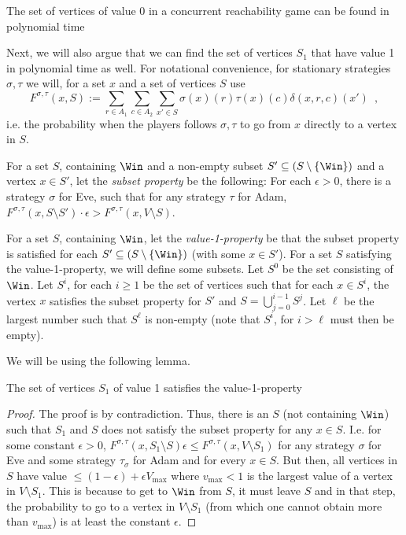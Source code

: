 \begin{lemma}\label{lemm:find_0_reach}
The set of vertices of value 0 in a concurrent reachability game can be found in polynomial time
\end{lemma}

Next, we will also argue that we can find the set of vertices $S_1$ that have value 1 in polynomial time as well.
For notational convenience, for stationary strategies $\sigma,\tau$ we will, for a set $x$ and a set of vertices $S$ use \[
F^{\sigma,\tau}(x,S):=\sum_{r\in A_1}\sum_{c\in A_2}\sum_{x'\in S}\sigma(x)(r)\tau(x)(c)\delta(x,r,c)(x')\enspace ,\]
 i.e. the probability when the players follows $\sigma,\tau$ to go from $x$ directly to a vertex in $S$.

For a set $S$, containing $\Win$ and a non-empty subset $S'\subseteq(S\setminus \{\Win\})$ and a vertex $x\in S'$, let the {\em subset property} be the following:
For each $\epsilon>0$, there is a strategy $\sigma$ for Eve, such that for any strategy $\tau$ for Adam, $F^{\sigma,\tau}(x,S\setminus S')\cdot \epsilon >F^{\sigma,\tau}(x,V\setminus S)$.

For a set $S$, containing $\Win$, let the {\em value-1-property} be that the subset property is satisfied for each $S'\subseteq(S\setminus \{\Win\})$ (with some $x\in S'$).
For a set $S$ satisfying the value-1-property, we will define some subsets.
Let $S^0$ be the set consisting of $\Win$.
Let $S^i$, for each $i\geq 1$ be the set of vertices such that for each $x\in S^i$,
the vertex $x$ satisfies the subset property for $S'$ and $S=\bigcup_{j=0}^{i-1}S^j$.
Let $\ell$ be the largest number such that $S^\ell$ is non-empty (note that $S^i$, for $i>\ell$ must then be empty).


We will be using the following lemma.



\begin{lemma}
The set of vertices $S_1$ of value 1 satisfies the value-1-property
\end{lemma}
\begin{proof}
The proof is by contradiction. Thus, there is an $S$ (not containing $\Win$) such that $S_1$ and $S$ does not satisfy the subset property for any $x\in S$. I.e. for some constant $\epsilon>0$,
$F^{\sigma,\tau}(x,S_1\setminus S)\epsilon \leq F^{\sigma,\tau}(x,V\setminus S_1)$ for any strategy $\sigma$ for Eve and some strategy $\tau_{\sigma}$ for Adam and for every $x\in S$.
But then, all vertices in $S$ have value $\leq (1-\epsilon)+\epsilon V_{\max}$ where $v_{\max}<1$ is the largest value of a vertex in $V\setminus S_1$.
This is because to get to $\Win$ from $S$, it must leave $S$ and in that step, the probability to go to a vertex in  $V\setminus S_1$ (from which one cannot obtain more than $v_{\max}$) is at least the constant $\epsilon$.  
\end{proof}

